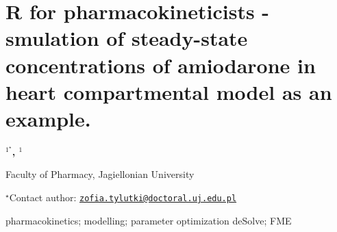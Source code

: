 \documentclass[\main/boa.tex]{subfiles}
\begin{document}
\section{R for pharmacokineticists - smulation of steady-state concentrations of
amiodarone in heart compartmental model as an example.}

\begin{center}
  {\bf {}$^{1^\star}$, $^{1}$}
\end{center}

\vskip 0.3cm

\begin{affiliations}
\begin{enumerate}
\begin{minipage}{0.915\textwidth}
\centering
\item Faculty of Pharmacy, Jagiellonian University \\[-2pt]
\end{minipage}
\end{enumerate}
$^\star$Contact author: \href{mailto:zofia.tylutki@doctoral.uj.edu.pl}{\nolinkurl{zofia.tylutki@doctoral.uj.edu.pl}}\\
\end{affiliations}

\vskip 0.5cm

\begin{minipage}{0.915\textwidth}
\keywords pharmacokinetics; modelling; parameter optimization
\packages deSolve; FME
\end{minipage}

\vskip 0.8cm
\end{document}
